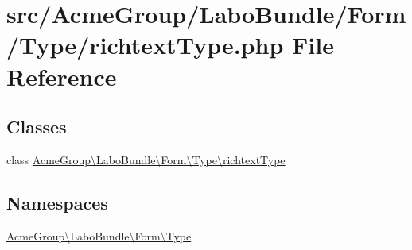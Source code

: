 \hypertarget{_type_2richtext_type_8php}{\section{src/\+Acme\+Group/\+Labo\+Bundle/\+Form/\+Type/richtext\+Type.php File Reference}
\label{_type_2richtext_type_8php}
}
\subsection*{Classes}
\begin{DoxyCompactItemize}
\item 
class \hyperlink{class_acme_group_1_1_labo_bundle_1_1_form_1_1_type_1_1richtext_type}{Acme\+Group\textbackslash{}\+Labo\+Bundle\textbackslash{}\+Form\textbackslash{}\+Type\textbackslash{}richtext\+Type}
\end{DoxyCompactItemize}
\subsection*{Namespaces}
\begin{DoxyCompactItemize}
\item 
 \hyperlink{namespace_acme_group_1_1_labo_bundle_1_1_form_1_1_type}{Acme\+Group\textbackslash{}\+Labo\+Bundle\textbackslash{}\+Form\textbackslash{}\+Type}
\end{DoxyCompactItemize}
